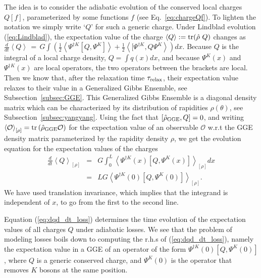 \documentclass[onecolumn,amsfonts,showpacs,superscriptaddress]{revtex4-1}
\begin{document}
The idea is to consider the adiabatic evolution of the conserved local charges $Q[f]$, parameterized by some functions $f$ (see Eq.~\ref{eq:chargeQf}). To lighten the notation we simply write `$Q$' for such a generic charge. Under Lindblad evolution (\ref{eq:Lindblad}), the expectation value of the charge $\left< Q \right> := {\rm tr}( \hat{\rho} ~Q) $ changes as $\frac{d}{dt} \left< Q \right> \, = \, G \int \left( \frac{1}{2} \left< \Psi^{\dagger K} [Q, \Psi^K] \right> + \frac{1}{2} \left< [\Psi^{\dagger K} , Q \Psi^K \right> \right) dx$.
Because $Q$ is the integral of a local charge density, $Q= \int q(x) dx$, and because $\Psi^K(x)$ and $\Psi^{\dagger K}(x)$ are local operators, the two operators between the brackets are local. Then we know that, after the relaxation time $\tau_{\rm relax}$, their expectation value relaxes to their value in a Generalized Gibbs Ensemble, see Subsection~\ref{subsec:GGE}. This Generalized Gibbs Ensemble is a diagonal density matrix which can be characterized by its distribution of rapidities $\rho(\theta)$, see Subsection~\ref{subsec:yangyang}. Using the fact that $[\hat{\rho}_{\rm GGE} , Q] = 0$, and writing $\left< \mathcal{O} \right>_{[\rho]} = {\rm tr}\left( \hat{\rho}_{\rm GGE} \mathcal{O} \right)$ for the expectation value of an observable $\mathcal{O}$ w.r.t the GGE density matrix parameterized by the rapidity density $\rho$, we get the evolution equation for the expectation values of the charges
\begin{eqnarray}
    \label{eq:dqd_dt_loss}
\nonumber    \frac{d}{dt} \left< Q \right>_{[\rho]} & = & G \int_0^L  \left< \Psi^{\dagger K}(x) [Q, \Psi^K(x)] \right>_{[\rho]} dx \\
    & = & L G \left< \Psi^{\dagger K}(0) [Q, \Psi^K(0)] \right>_{[\rho]} .
\end{eqnarray}
We have used translation invariance, which implies that the integrand is independent of $x$, to go from the first to the second line.

Equation (\ref{eq:dqd_dt_loss}) determines the time evolution of the expectation values of all charges $Q$ under adiabatic losses. We see that the problem of modeling losses boils down to computing the r.h.s of (\ref{eq:dqd_dt_loss}), namely the  expectation value in a GGE of an operator of the form $\Psi^{\dagger K}(0) [Q, \Psi^K(0)]$, where $Q$ is a generic conserved charge, and $\Psi^K(0)$ is the operator that removes $K$ bosons at the same position.
\end{document}
